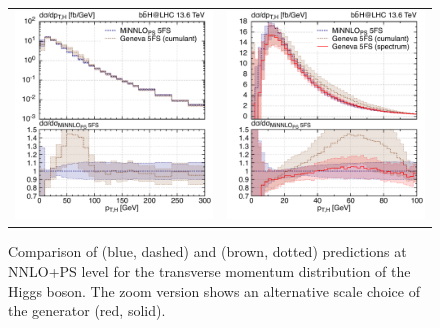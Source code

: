 \documentclass[11pt,a4paper]{article}
\begin{document}
\begin{figure}[t!]
\begin{center}
\begin{tabular}{cc}
\includegraphics[width=.45\textwidth, page=1]{plots/5fs/genevaminnlo/minnloKQvar-geneva-ptH.pdf}&
\includegraphics[width=.45\textwidth, page=1]{plots/5fs/genevaminnlo/minnloKQvar-genevaspec-ptHzoom.pdf}
\end{tabular}
\vspace*{1ex}
\caption{Comparison of \minnlo{} (blue, dashed) and \GENEVA{} (brown, dotted) predictions at NNLO+PS level for the transverse momentum distribution of the Higgs boson. The zoom version shows an alternative scale choice of the \GENEVA{} generator (red, solid).\label{fig:genevaptH}}
\end{center}
\end{figure}
\end{document}
